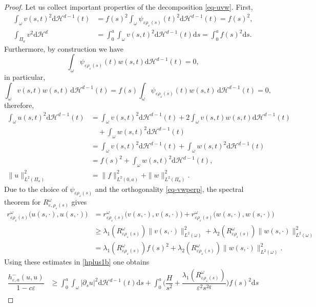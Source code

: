 \documentclass[10pt,a4paper]{amsart}
\newcommand{\dd}{\mathrm{d}}
\newcommand{\eps}{\varepsilon}
\renewcommand{\H}{\mathcal{H}}
\begin{document}
\begin{proof}
Let us collect important properties of the decomposition \eqref{eq-uvw}.
First,
\begin{align*}
	\int_\omega v(s,t)^2\dd \H^{d-1}(t)&=f(s)^2\int_\omega \psi_{\eps\rho_\eps(s)}(t)^2\dd \H^{d-1}(t)=f(s)^2,\\
	\int_{\Pi_a}v^2\dd\H^d&=\int_0^a 	\int_\omega v(s,t)^2\dd \H^{d-1}(t)\dd s=\int_0^a f(s)^2\dd s.
\end{align*}
Furthermore, by construction we have
\begin{equation}
	\label{vw00}
\int_\omega \psi_{\eps\rho_\eps(s)}(t)w(s,t)\dd \H^{d-1}(t)=0,
\end{equation}
in particular,
\begin{equation}
	\label{eq-vwperp}
\int_\omega v(s,t)w(s,t)\,\dd \H^{d-1}(t)=f(s)\int_\omega \psi_{\eps\rho_\eps(s)}(t)w(s,t)\,\dd \H^{d-1}(t)
=0,
\end{equation}
therefore,
\begin{align*}
	\int_\omega u(s,t)^2\dd\H^{d-1}(t)&=\int_\omega v(s,t)^2\dd \H^{d-1}(t) +2 \int_\omega v(s,t)w(s,t)\dd \H^{d-1}(t)\\
	&\quad+\int_\omega w(s,t)^2\dd \H^{d-1}(t)\\
	&=\int_\omega v(s,t)^2\dd \H^{d-1}(t) +\int_\omega w(s,t)^2\dd \H^{d-1}(t)\\
	&=f(s)^2+\int_\omega w(s,t)^2\dd \H^{d-1}(t),\\
	\|u\|^2_{L^2(\Pi_a)}&=\|f\|^2_{L^2(0,a)}+\|w\|^2_{L^2(\Pi_a)}.
\end{align*}
Due to the choice of $\psi_{\eps\rho_\eps(s)}$ and the orthogonality  \eqref{eq-vwperp}, the spectral theorem for $R^\omega_{\eps,\rho_\eps(s)}$ gives
\begin{align*}
r^\omega_{\eps\rho_\eps(s)}\big(u(s,\cdot),u(s,\cdot)\big)&=
r^\omega_{\eps\rho_\eps(s)}\big(v(s,\cdot),v(s,\cdot)\big)+r^\omega_{\eps\rho_\eps(s)}\big(w(s,\cdot),w(s,\cdot)\big)\\
&\ge
\lambda_1(R^\omega_{\eps\rho_\eps(s)}) \big\| v(s,\cdot)\big\|^2_{L^2(\omega)}
+\lambda_2(R^\omega_{\eps\rho_\eps(s)}) \big\| w(s,\cdot)\big\|^2_{L^2(\omega)}\\
&=\lambda_1(R^\omega_{\eps\rho_\eps(s)}) f(s)^2
+\lambda_2(R^\omega_{\eps\rho_\eps(s)}) \big\| w(s,\cdot)\big\|^2_{L^2(\omega)}.
\end{align*}
Using these estimates in \eqref{hplus1b} one obtains
\begin{align*}
	\dfrac{h^-_{\eps,a}(u,u)}{1-c\eps}&\ge \int_0^a\int_\omega |\partial_s u|^2\dd\H^{d-1}(t)\dd s+\int_0^a\bigg(\dfrac{H}{s^2}+\dfrac{\lambda_1(R^\omega_{\eps\rho_\eps(s)})}{\eps^2 s^{2q}}\bigg)f(s)^2\dd s\\

\end{align*}
\end{proof}
\end{document}

